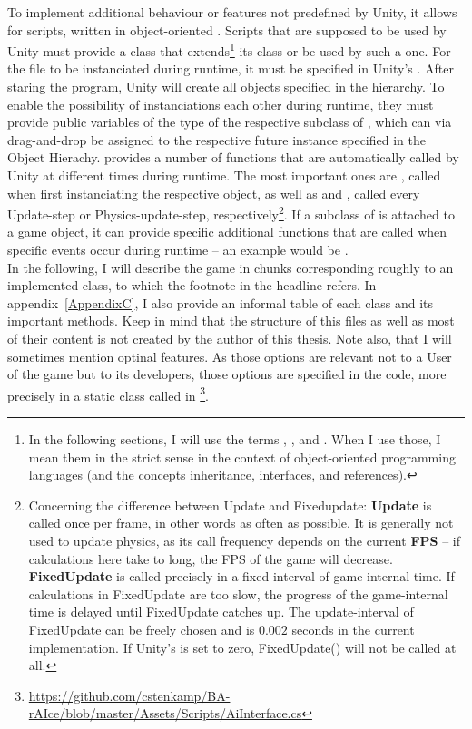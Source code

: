 To implement additional behaviour or features not predefined by Unity, it allows for scripts, written in object-oriented . Scripts that are supposed to be used by Unity must provide a class that extends\footnote{In the following sections, I will use the terms , ,  and . When I use those, I mean them in the strict sense in the context of object-oriented programming languages (and the concepts inheritance, interfaces, and references).} its class  or be used by such a one. 
For the file to be instanciated during runtime, it must be specified in Unity's . After staring the program, Unity will create all objects specified in the hierarchy. To enable the possibility of instanciations  each other during runtime, they must provide public variables of the type of the respective subclass of , which can via drag-and-drop be assigned to the respective future instance specified in the Object Hierachy.  provides a number of functions that are automatically called by Unity at different times during runtime. The most important ones are , called when first instanciating the respective object, as well as  and , called every Update-step or Physics-update-step, respectively\footnote{Concerning the difference between Update and Fixedupdate: \textbf{Update} is called once per frame, in other words as often as possible. It is generally not used to update physics, as its call frequency depends on the current \textbf{FPS} -- if calculations here take to long, the FPS of the game will decrease. \textbf{FixedUpdate} is called precisely in a fixed interval of game-internal time. If calculations in FixedUpdate are too slow, the progress of the game-internal time is delayed until FixedUpdate catches up. The update-interval of FixedUpdate can be freely chosen and is $0.002$ seconds in the current implementation. If Unity's  is set to zero, FixedUpdate() will not be called at all.}. If a subclass of  is attached to a game object, it can provide specific additional functions that are called when specific events occur during runtime -- an example would be .\\

In the following, I will describe the game in chunks corresponding roughly to an implemented class, to which the footnote in the headline refers. In appendix~\ref{AppendixC}, I also provide an informal table of each class and its important methods. Keep in mind that the structure of this files as well as most of their content is not created by the author of this thesis. Note also, that I will sometimes mention optinal features. As those options are relevant not to a User of the game but to its developers, those options are specified in the code, more precisely in a static class called  in \footnote{\label{aiint} \url{https://github.com/cstenkamp/BA-rAIce/blob/master/Assets/Scripts/AiInterface.cs}}.

